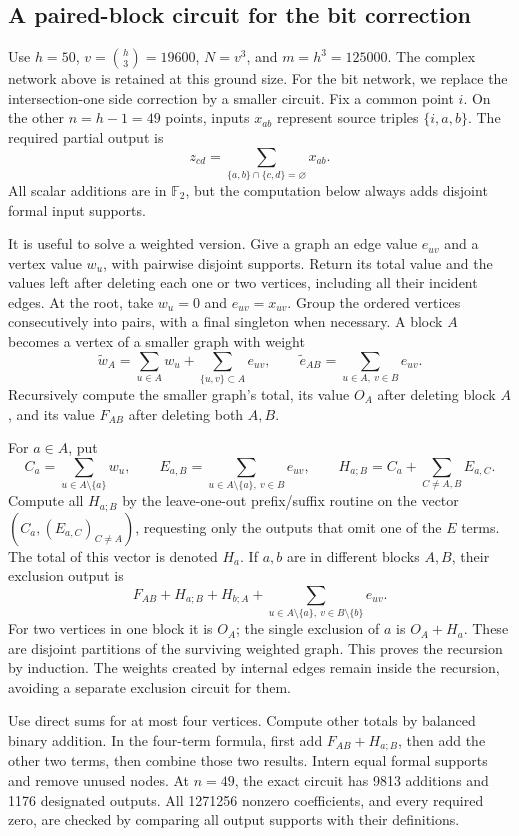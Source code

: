 \subsection{A paired-block circuit for the bit correction}
\label{sec:paired-bit-construction}
Use $h=50$, $v=\binom h3=19600$, $N=v^3$, and $m=h^3=125000$.
The complex network above is retained at this ground size. For the bit
network, we replace the intersection-one side correction by a smaller circuit.
Fix a common point $i$. On the other $n=h-1=49$ points, inputs $x_{ab}$
represent source triples $\{i,a,b\}$. The required partial output is
\[
 z_{cd}=\sum_{\{a,b\}\cap\{c,d\}=\varnothing}x_{ab}.
\]
All scalar additions are in $\mathbb F_2$, but the computation below always
adds disjoint formal input supports.

It is useful to solve a weighted version. Give a graph an edge value $e_{uv}$
and a vertex value $w_u$, with pairwise disjoint supports. Return its total
value and the values left after deleting each one or two vertices, including
all their incident edges. At the root, take $w_u=0$ and $e_{uv}=x_{uv}$.
Group the ordered vertices consecutively into pairs, with a final singleton
when necessary. A block $A$ becomes a vertex of a smaller graph with weight
\[
 \widetilde w_A=\sum_{u\in A}w_u+\sum_{\{u,v\}\subset A}e_{uv},
 \qquad
 \widetilde e_{AB}=\sum_{u\in A,\ v\in B}e_{uv}.
\]
Recursively compute the smaller graph's total, its value $O_A$ after deleting
block $A$, and its value $F_{AB}$ after deleting both $A,B$.

For $a\in A$, put
\[
 C_a=\sum_{u\in A\setminus\{a\}}w_u,\qquad
 E_{a,B}=\sum_{u\in A\setminus\{a\},\ v\in B}e_{uv},\qquad
 H_{a;B}=C_a+\sum_{C\ne A,B}E_{a,C}.
\]
Compute all $H_{a;B}$ by the leave-one-out prefix/suffix routine on the
vector $(C_a,(E_{a,C})_{C\ne A})$, requesting only the outputs that omit
one of the $E$ terms. The total of this vector is denoted $H_a$.
If $a,b$ are in different blocks $A,B$, their exclusion output is
\[
 F_{AB}+H_{a;B}+H_{b;A}
   +\sum_{u\in A\setminus\{a\},\ v\in B\setminus\{b\}}e_{uv}.
\]
For two vertices in one block it is $O_A$; the single exclusion of $a$ is
$O_A+H_a$. These are disjoint partitions of the surviving weighted graph.
This proves the recursion by induction. The weights created by internal edges
remain inside the recursion, avoiding a separate exclusion circuit for them.

Use direct sums for at most four vertices. Compute other totals by balanced
binary addition. In the four-term formula, first add $F_{AB}+H_{a;B}$,
then add the other two terms, then combine those two results. Intern equal
formal supports and remove unused nodes. At $n=49$, the exact circuit has
9813 additions and 1176 designated outputs. All 1271256 nonzero coefficients,
and every required zero, are checked by comparing all output supports with
their definitions.

